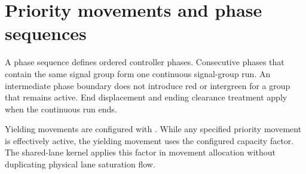 \chapter{Priority movements and phase sequences}
A phase sequence defines ordered controller phases. Consecutive phases that
contain the same signal group form one continuous signal-group run. An
intermediate phase boundary does not introduce red or intergreen for a group
that remains active. End displacement and ending clearance treatment apply
when the continuous run ends.

Yielding movements are configured with . While any
specified priority movement is effectively active, the yielding movement uses
the configured capacity factor. The shared-lane kernel applies this factor in
movement allocation without duplicating physical lane saturation flow.
